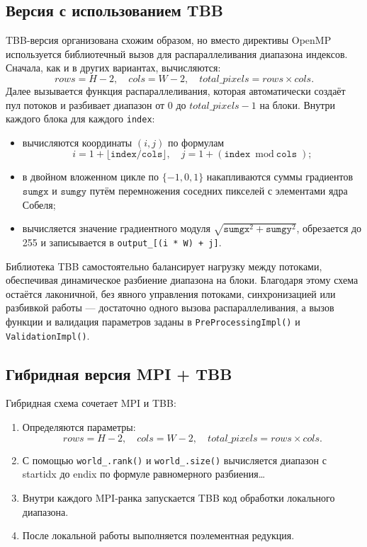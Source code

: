 \documentclass[12pt]{article}
\begin{document}
\subsection{Версия с использованием TBB}

TBB-версия организована схожим образом, но вместо директивы OpenMP используется библиотечный вызов для распараллеливания диапазона индексов. Сначала, как и в других вариантах, вычисляются:
\[
rows = H - 2,\quad cols = W - 2,\quad total\_pixels = rows \times cols.
\]
Далее вызывается функция распараллеливания, которая автоматически создаёт пул потоков и разбивает диапазон от \(0\) до \(total\_pixels - 1\) на блоки. Внутри каждого блока для каждого \texttt{index}:
\begin{itemize}
    \item вычисляются координаты \((i,j)\) по формулам
    \[
        i = 1 + \bigl\lfloor \texttt{index} / \texttt{cols} \bigr\rfloor,\quad
        j = 1 + (\texttt{index} \bmod \texttt{cols});
    \]
    \item в двойном вложенном цикле по \(\{-1,0,1\}\) накапливаются суммы градиентов \(\texttt{sumgx}\) и \(\texttt{sumgy}\) путём перемножения соседних пикселей с элементами ядра Собеля;
    \item вычисляется значение градиентного модуля \(\sqrt{\texttt{sumgx}^2 + \texttt{sumgy}^2}\), обрезается до 255 и записывается в \texttt{output\_[(i * W) + j]}.
\end{itemize}
Библиотека TBB самостоятельно балансирует нагрузку между потоками, обеспечивая динамическое разбиение диапазона на блоки. Благодаря этому схема остаётся лаконичной, без явного управления потоками, синхронизацией или разбивкой работы — достаточно одного вызова распараллеливания, а вызов функции и валидация параметров заданы в \texttt{PreProcessingImpl()} и \texttt{ValidationImpl()}.

\subsection{Гибридная версия MPI + TBB}

Гибридная схема сочетает MPI и TBB:
\begin{enumerate}
    \item Определяются параметры:
    \[
        rows = H - 2,\quad cols = W - 2,\quad total\_pixels = rows \times cols.
    \]
    \item С помощью \texttt{world\_.rank()} и \texttt{world\_.size()} вычисляется диапазон с startidx до endix по формуле равномерного разбиения…
    \item Внутри каждого MPI-ранка запускается TBB код
    обработки локального диапазона.  
    \item После локальной работы выполняется поэлементная редукция.

\end{enumerate}
\end{document}
